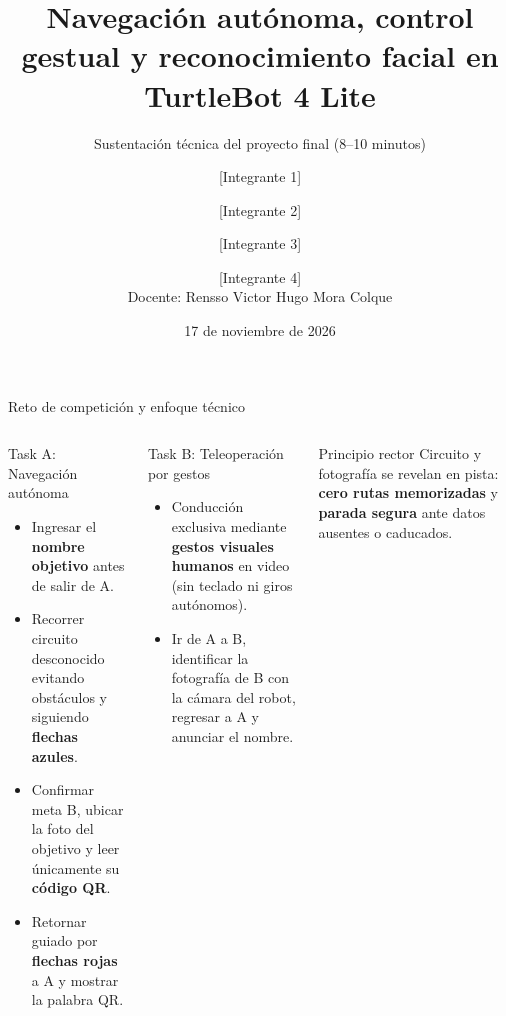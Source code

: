 \documentclass[aspectratio=169,10pt]{beamer}
\title[TurtleBot 4 Lite: Visión y Navegación]{Navegación autónoma, control gestual y reconocimiento facial en TurtleBot 4 Lite}
\subtitle{Sustentación técnica del proyecto final (8--10 minutos)}
\author[Equipo UTEC]{[Integrante 1] \and [Integrante 2] \and [Integrante 3] \and [Integrante 4]\\[0.3em]\footnotesize Docente: Rensso Victor Hugo Mora Colque}
\institute[UTEC]{Universidad de Ingeniería y Tecnología (UTEC)}
\date{17 de noviembre de 2026}
\begin{document}
\begin{frame}[plain]
  \titlepage
\end{frame}

\begin{frame}{Reto de competición y enfoque técnico}
  \small
  \begin{columns}[T,onlytextwidth]
    \begin{block}{Task A: Navegación autónoma}
      \begin{itemize}
        \item Ingresar el \textbf{nombre objetivo} antes de salir de A.
        \item Recorrer circuito desconocido evitando obstáculos y siguiendo \textbf{flechas azules}.
        \item Confirmar meta B, ubicar la foto del objetivo y leer únicamente su \textbf{código QR}.
        \item Retornar guiado por \textbf{flechas rojas} a A y mostrar la palabra QR.
      \end{itemize}
    \end{block}

    \begin{block}{Task B: Teleoperación por gestos}
      \begin{itemize}
        \item Conducción exclusiva mediante \textbf{gestos visuales humanos} en video (sin teclado ni giros autónomos).
        \item Ir de A a B, identificar la fotografía de B con la cámara del robot, regresar a A y anunciar el nombre.
      \end{itemize}
    \end{block}
    \vspace{0.45em}
    \begin{alertblock}{Principio rector}
      Circuito y fotografía se revelan en pista: \textbf{cero rutas memorizadas} y \textbf{parada segura} ante datos ausentes o caducados.
    \end{alertblock}
  \end{columns}
\end{frame}
\end{document}
